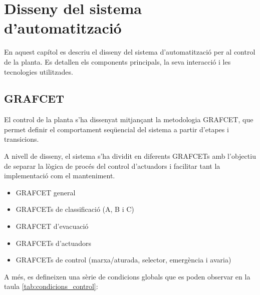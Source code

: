 \documentclass[12pt,a4paper]{report}
\begin{document}
\chapter{Disseny del sistema d'automatització}
En aquest capítol es descriu el disseny del sistema d'automatització per al control de la planta. Es detallen els components principals, la seva interacció i les tecnologies utilitzades.

\section{GRAFCET}

El control de la planta s'ha dissenyat mitjançant la metodologia GRAFCET, que permet definir el comportament seqüencial del sistema a partir d'etapes i transicions.

A nivell de disseny, el sistema s'ha dividit en diferents GRAFCETs amb l'objectiu de separar la lògica de procés del control d'actuadors i facilitar tant la implementació com el manteniment.

\begin{itemize}
\item GRAFCET general
\item GRAFCETs de classificació (A, B i C)
\item GRAFCET d'evacuació
\item GRAFCETs d'actuadors
\item GRAFCETs de control (marxa/aturada, selector, emergència i avaria)
\end{itemize}

A més, es defineixen una sèrie de condicions globals que es poden observar en la taula \ref{tab:condicions_control}:
\end{document}
